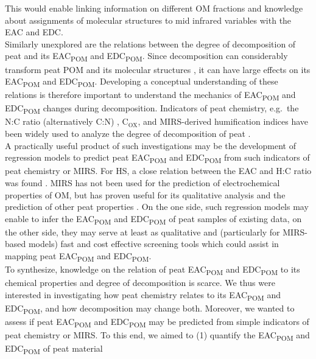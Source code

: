 \documentclass[draft,linenumbers]{agujournal2018}
\begin{document}
This would enable linking information on different OM fractions and
knowledge about assignments of molecular structures to mid infrared
variables with the EAC and EDC.\\
Similarly unexplored are the relations between the degree of
decomposition of peat and its EAC\textsubscript{POM} and
EDC\textsubscript{POM}. Since decomposition can considerably transform
peat POM and its molecular structures \citep{Cocozza.2003}, it can have
large effects on its EAC\textsubscript{POM} and EDC\textsubscript{POM}.
Developing a conceptual understanding of these relations is therefore
important to understand the mechanics of EAC\textsubscript{POM} and
EDC\textsubscript{POM} changes during decomposition. Indicators of peat
chemistry, e.g.~the N:C ratio (alternatively C:N) \citep{Biester.2014},
C\(_\text{OX}\), and MIRS-derived humification indices
\citep{Broder.2012} have been widely used to analyze the degree of
decomposition of peat \citep{Biester.2014, Drollinger.2020}.\\
A practically useful product of such investigations may be the
development of regression models to predict peat EAC\textsubscript{POM}
and EDC\textsubscript{POM} from such indicators of peat chemistry or
MIRS. For HS, a close relation between the EAC and H:C ratio was found
\citep{Aeschbacher.2010, Tan.2017}. MIRS has not been used for the
prediction of electrochemical properties of OM, but has proven useful
for its qualitative analysis \citep{HernandezMontoya.2012, Yuan.2018}
and the prediction of other peat properties
\citep{Hodgkins.2018, Artz.2008}. On the one side, such regression
models may enable to infer the EAC\textsubscript{POM} and
EDC\textsubscript{POM} of peat samples of existing data, on the other
side, they may serve at least as qualitative and (particularly for
MIRS-based models) fast and cost effective screening tools which could
assist in mapping peat EAC\textsubscript{POM} and
EDC\textsubscript{POM}.\\
To synthesize, knowledge on the relation of peat EAC\textsubscript{POM}
and EDC\textsubscript{POM} to its chemical properties and degree of
decomposition is scarce. We thus were interested in investigating how
peat chemistry relates to its EAC\textsubscript{POM} and
EDC\textsubscript{POM}, and how decomposition may change both. Moreover,
we wanted to assess if peat EAC\textsubscript{POM} and
EDC\textsubscript{POM} may be predicted from simple indicators of peat
chemistry or MIRS. To this end, we aimed to (1) quantify the
EAC\textsubscript{POM} and EDC\textsubscript{POM} of peat material
\end{document}
